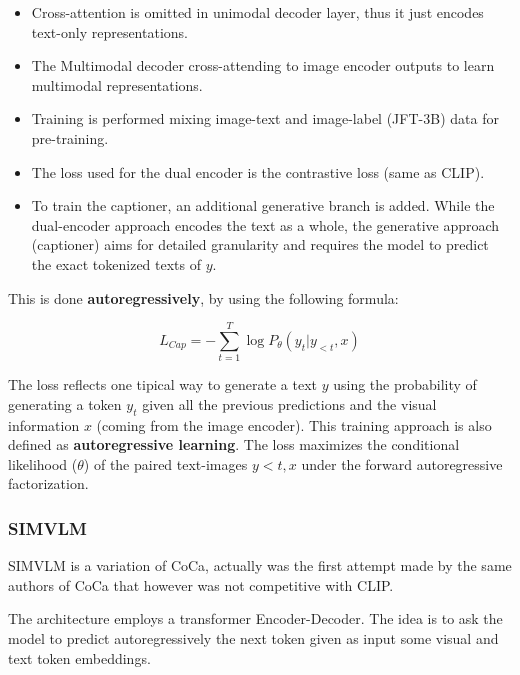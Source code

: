 \begin{itemize}
    \item Cross-attention is omitted in unimodal decoder layer, thus it just encodes text-only representations.

    \vspace{ 5 pt}
    \item The Multimodal decoder cross-attending to image encoder outputs to learn multimodal representations.
    \vspace{5 pt}
    \item  Training is performed mixing image-text and image-label (JFT-3B) data for pre-training.

    \vspace{5pt}
    \item The loss used for the dual encoder is  the contrastive loss (same as CLIP).

    \vspace{5 pt}
    \item To train the captioner, an additional generative branch is added. While the dual-encoder approach encodes the text as a whole, the generative approach (captioner) aims for detailed granularity and requires the model to
predict the exact tokenized texts of $y$.

\end{itemize}

This is done \textbf{autoregressively}, by using the following formula:



$$L_{Cap} = - \sum_{t=1}^{T}\log P_{\theta}(y_t|y_{<t},x) $$

The loss reflects one tipical way to generate a text $y$ using the probability of generating a token $y_t$ given all the previous predictions and the visual information $x$ (coming from the image encoder). This training approach is also defined as \textbf{autoregressive learning}. The loss maximizes the
conditional likelihood ($\theta$) of the paired text-images $y<t,x$ under the forward autoregressive factorization.

\subsubsection{SIMVLM}

SIMVLM is a variation of CoCa, actually was the first attempt made by the same authors of CoCa that however was not competitive with CLIP.

The architecture employs a transformer Encoder-Decoder. The idea is to ask the model to predict autoregressively the next token given as input some visual and text token embeddings.

